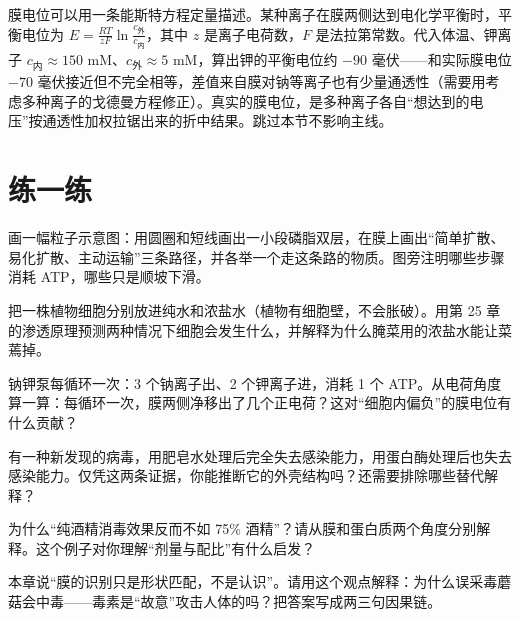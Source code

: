 \begin{tiaozhan}
膜电位可以用一条能斯特方程定量描述。某种离子在膜两侧达到电化学平衡时，平衡电位为 $E = \frac{RT}{zF}\ln\frac{c_{\text{外}}}{c_{\text{内}}}$，其中 $z$ 是离子电荷数，$F$ 是法拉第常数。代入体温、钾离子 $c_{\text{内}}\approx 150$ mM、$c_{\text{外}}\approx 5$ mM，算出钾的平衡电位约 $-90$ 毫伏——和实际膜电位 $-70$ 毫伏接近但不完全相等，差值来自膜对钠等离子也有少量通透性（需要用考虑多种离子的戈德曼方程修正）。真实的膜电位，是多种离子各自“想达到的电压”按通透性加权拉锯出来的折中结果。跳过本节不影响主线。
\end{tiaozhan}

\section*{练一练}

\begin{sikaoti}
\item 画一幅粒子示意图：用圆圈和短线画出一小段磷脂双层，在膜上画出“简单扩散、易化扩散、主动运输”三条路径，并各举一个走这条路的物质。图旁注明哪些步骤消耗 ATP，哪些只是顺坡下滑。
\item 把一株植物细胞分别放进纯水和浓盐水（植物有细胞壁，不会胀破）。用第 25 章的渗透原理预测两种情况下细胞会发生什么，并解释为什么腌菜用的浓盐水能让菜蔫掉。
\item 钠钾泵每循环一次：3 个钠离子出、2 个钾离子进，消耗 1 个 ATP。从电荷角度算一算：每循环一次，膜两侧净移出了几个正电荷？这对“细胞内偏负”的膜电位有什么贡献？
\item 有一种新发现的病毒，用肥皂水处理后完全失去感染能力，用蛋白酶处理后也失去感染能力。仅凭这两条证据，你能推断它的外壳结构吗？还需要排除哪些替代解释？
\item 为什么“纯酒精消毒效果反而不如 75\% 酒精”？请从膜和蛋白质两个角度分别解释。这个例子对你理解“剂量与配比”有什么启发？
\item 本章说“膜的识别只是形状匹配，不是认识”。请用这个观点解释：为什么误采毒蘑菇会中毒——毒素是“故意”攻击人体的吗？把答案写成两三句因果链。
\end{sikaoti}
